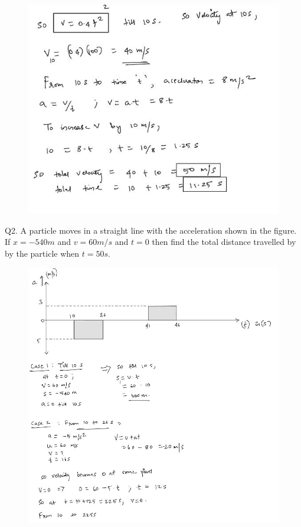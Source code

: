 \documentclass[11pt]{article}
\begin{document}
\begin{figure}[H]
	\includegraphics[scale=0.8]{a12.jpg}
	\label{fig: Polygon Law}
\end{figure}

\pagebreak
Q2. A particle moves in a straight line with the acceleration shown in the figure. If $x = -540m$ and $v = 60m/s$ and $t = 0$ then find the total distance travelled by by the particle when $t = 50s$.

\begin{figure}[H]
	\includegraphics[scale=0.7]{a21.jpg}
	\label{fig: Polygon Law}
\end{figure}
\end{document}
